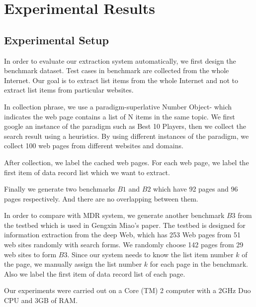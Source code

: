 \section{Experimental Results}
\label{sec:eval}

\subsection{Experimental Setup}

In order to evaluate our extraction system automatically, we first design the benchmark
dataset. Test cases in benchmark are collected from the whole Internet. Our goal is to 
extract list items from the whole Internet and not to extract list items from 
particular websites.

In collection phrase, we use a paradigm-superlative Number Object- which indicates the web page contains a list of N items in the same topic. We first google an instance of the paradigm such as Best 10 Players, then we collect the search result using a heuristics. By using different instances of the paradigm, we collect 100 web pages from different websites and domains.

After collection, we label the cached web pages. 
For each web page, we label the first item of data record list which we want to extract.

Finally we generate two benchmarks $B1$ and $B2$
which have 92 pages and 96 pages respectively.
And there are no overlapping between them.

In order to compare with MDR\cite{LiuGZ03:MDR} system,
we generate another benchmark $B3$ 
from the testbed\cite{deepwebtestbed} 
which is used in Gengxin Miao's paper\cite{MiaoTHSM09:TagPathClustering}.
The testbed is designed for information extraction from the deep Web,
which has 253 Web pages from 51 web sites randomly with search forms.
We randomly choose 142 pages from 29 web sites to form $B3$.
Since our system needs to know the list item number $k$ of the page,
we manually assign the list number $k$ for each page in the benchmark.
Also we label the first item of data record list of each page.

Our experiments were carried out on a Core (TM) 2 computer
with a 2GHz Duo CPU and 3GB of RAM. 

